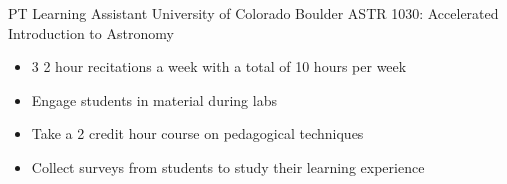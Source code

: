     {PT}
    {Learning Assistant}
    {University of Colorado Boulder}
    {ASTR 1030: Accelerated Introduction to Astronomy}
    {\begin{itemize}
    \setlength\itemsep{0.1em}
        \item 3 2 hour recitations a week with a total of 10 hours per week
        \item Engage students in material during labs
        \item Take a 2 credit hour course on pedagogical techniques
        \item Collect surveys from students to study their learning experience
    \end{itemize}
}
